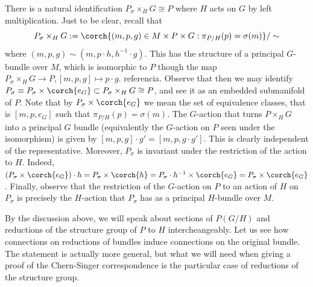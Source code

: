 \begin{obs} \label{obs_red_struc_group}
    There is a natural identification \(P_\sigma \times_H G\cong P\) where \(H\) acts on \(G\) by left multiplication. Just to be clear, recall that
    \[
    P_\sigma \times _H G:=\corch{(m,p, g)\in M \times P\times G : \pi_{P/H}(p)=\sigma(m)}/\sim
    \]
    where \((m,p,g)\sim(m, p\cdot h, h^{-1}\cdot g)\). This has the structure of a principal \(G\)-bundle over \(M\), which is isomorphic to \(P\) though the map \(P_\sigma \times_H G \to P, [m,p,g] \mapsto p\cdot g\). {\color{red} referencia}. {\color{red}Observe that then we may identify \(P_\sigma \equiv P_\sigma \times \corch{e_G} \subset P_\sigma \times_HG \cong P\), and see it as an embedded submanifold of \(P\). Note that by \(P_\sigma \times \corch{e_G}\) we mean the set of equivalence classes, that is \([m,p,e_G]\) such that \(\pi_{P/H}(p)=\sigma(m)\). The \(G\)-action that turns \(P \times_H G\) into a principal \(G\) bundle (equivalently the \(G\)-action on \(P\) seen under the isomorphism) is given by \([m,p,g]\cdot g'=[m, p, g\cdot g']\). This is clearly independent of the representative. Moreover, \(P_\sigma\) is invariant under the restriction of the action to \(H\). Indeed, \((P_\sigma \times \corch{e_G})\cdot h=P_\sigma\times \corch{h}=P_\sigma\cdot h^{-1}\times \corch{e_G}=P_\sigma\times\corch{e_G}\). Finally, observe that the restriction of the \(G\)-action on \(P\) to an action of \(H\) on \(P_\sigma\) is precisely the \(H\)-action that \(P_\sigma\) has as a principal \(H\)-bundle over \(M\).}
\end{obs}
By the discussion above, we will speak about sections of \(P(G/H)\) and reductions of the structure group of \(P\) to \(H\) intercheangeably. Let us see how connections on reductions of bundles induce connections on the original bundle. The statement is actually more general, but what we will need when giving a proof of the Chern-Singer correspondence is the particular case of reductions of the structure group.

